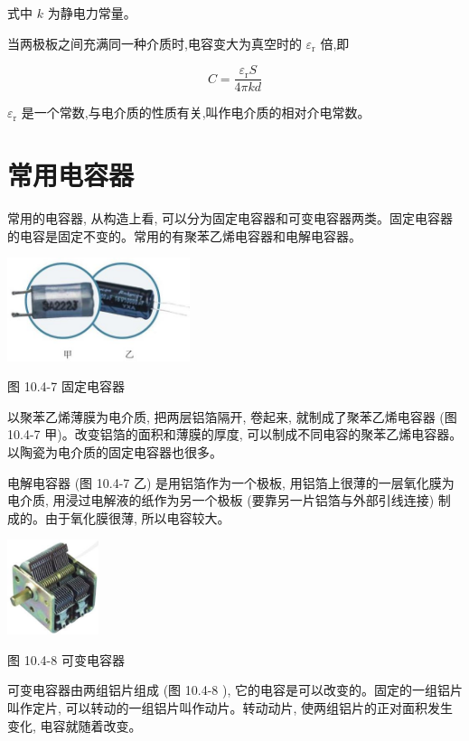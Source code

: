 \documentclass[10pt]{article}
\begin{document}
式中 \(k\) 为静电力常量。

当两极板之间充满同一种介质时,电容变大为真空时的 \({\varepsilon }_{\mathrm{r}}\) 倍,即

\[
C = \frac{{\varepsilon }_{\mathrm{r}}S}{4\pi kd}
\]

\({\varepsilon }_{\mathrm{r}}\) 是一个常数,与电介质的性质有关,叫作电介质的相对介电常数。

\section*{常用电容器}

常用的电容器, 从构造上看, 可以分为固定电容器和可变电容器两类。固定电容器的电容是固定不变的。常用的有聚苯乙烯电容器和电解电容器。

\begin{center}
\includegraphics[max width=0.4\textwidth]{images/01911d5f-8e38-70c0-b5b8-2b399bd115b6_47_295190.jpg}
\end{center}

图 10.4-7 固定电容器

以聚苯乙烯薄膜为电介质, 把两层铝箔隔开, 卷起来, 就制成了聚苯乙烯电容器 (图 10.4-7 甲)。改变铝箔的面积和薄膜的厚度, 可以制成不同电容的聚苯乙烯电容器。 以陶瓷为电介质的固定电容器也很多。

电解电容器 (图 10.4-7 乙) 是用铝箔作为一个极板, 用铝箔上很薄的一层氧化膜为电介质, 用浸过电解液的纸作为另一个极板 (要靠另一片铝箔与外部引线连接) 制成的。由于氧化膜很薄, 所以电容较大。

\begin{center}
\includegraphics[max width=0.2\textwidth]{images/01911d5f-8e38-70c0-b5b8-2b399bd115b6_47_730493.jpg}
\end{center}

图 10.4-8 可变电容器

可变电容器由两组铝片组成 (图 10.4-8 ), 它的电容是可以改变的。固定的一组铝片叫作定片, 可以转动的一组铝片叫作动片。转动动片, 使两组铝片的正对面积发生变化, 电容就随着改变。
\end{document}
